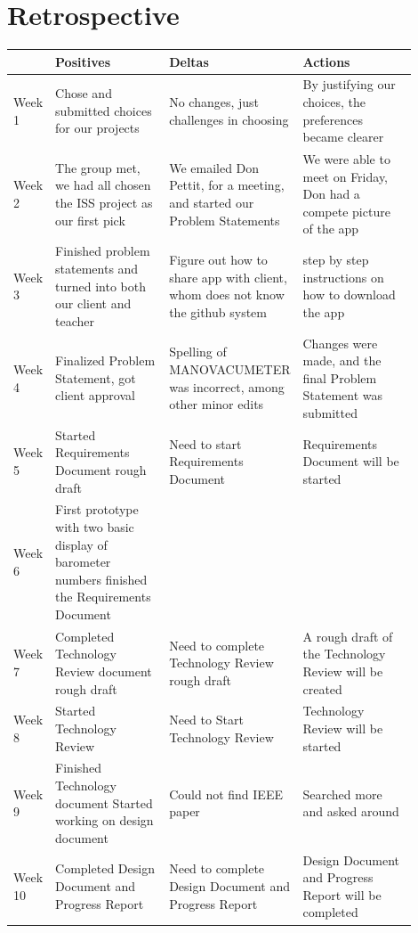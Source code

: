 \documentclass[onecolumn, draftclsnofoot,10pt, compsoc]{IEEEtran}
\begin{document}
\section{Retrospective}
\begin{center}
	\begin{tabular}{| l | p{0.3\linewidth} | p{0.3\linewidth} | p{0.3\linewidth} |}
		\hline
		& Positives & Deltas & Actions \\ \hline
    Week 1 & Chose and submitted choices for our projects
      & No changes, just challenges in choosing
      & By justifying our choices, the preferences became clearer \\ \hline
		Week 2 & The group met, we had all chosen the ISS project as our first pick
      & We emailed Don Pettit, for a meeting, and started our Problem Statements
      & We were able to meet on Friday, Don had a compete picture of the app\\ \hline			%
		Week 3 & Finished problem statements and turned into both our client and teacher
 & Figure out how to share app with client, whom does not know the github system
 & step by step instructions on how to download the app \\ \hline
		Week 4 & Finalized Problem Statement, got client approval
      & Spelling of MANOVACUMETER was incorrect, among other minor edits
      & Changes were made, and the final Problem Statement was submitted \\ \hline
    Week 5 & Started Requirements Document rough draft & Need to start Requirements Document & Requirements Document will be started \\ \hline
		Week 6 & First prototype with two basic display of barometer numbers
  finished the Requirements Document & & \\ \hline
  	Week 7 & Completed Technology Review document rough draft & Need to complete Technology Review rough draft & A rough draft of the Technology Review will be created \\ \hline
		Week 8 & Started Technology Review & Need to Start Technology Review & Technology Review will be started \\ \hline
		Week 9 &Finished Technology document
Started working on design document
 & Could not find IEEE paper & Searched more and asked around\\ \hline
		Week 10 & Completed Design Document and Progress Report & Need to complete Design Document and Progress Report & Design Document and Progress Report will be completed \\ \hline

	\end{tabular}
\end{center}

\newpage


\end{document}
